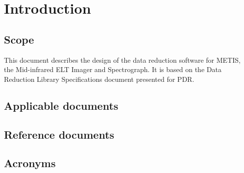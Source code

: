 \documentclass[11pt,oneside,a4paper]{article}
\begin{document}


\section{Introduction}
\label{sec:intro}

\subsection{Scope}

This document describes the design of the data reduction software for
METIS, the Mid-infrared ELT Imager and Spectrograph. It is based on
the Data Reduction Library Specifications document \cite{DRLS} presented
for PDR.

\subsection{Applicable documents}

\begin{refcontext}[labelprefix=AD]
  \printbibliography[keyword=applicable, heading=none]
\end{refcontext}


\subsection{Reference documents}

\begin{refcontext}[labelprefix=RD]
  \printbibliography[keyword=reference, heading=none]
\end{refcontext}


\clearpage

\subsection{Acronyms}
\label{ssec:acronyms}


\clearpage

% 
\end{document}
